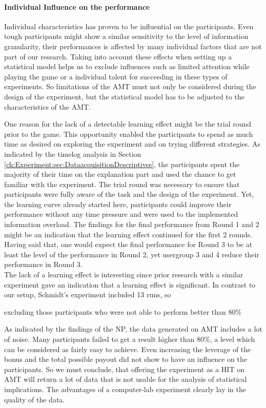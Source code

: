 \paragraph{Individual Influence on the performance}
Individual characteristics has proven to be influential on the participants. Even tough participants might show a similar sensitivity to the level of information granularity, their performances is affected by many individual factors that are not part of our research. Taking into account these effects when setting up a statistical model helps us to exclude influences such as limited attention while playing the game or a individual talent for succeeding in these types of experiments. So limitations of the \acl{AMT} must not only be considered during the design of the experiment, but the statistical model has to be adjusted to the characteristics of the \ac{AMT}.



One reason for the lack of a detectable learning effect might be the trial round prior to the game. This opportunity enabled the participants to spend as much time as desired on exploring the experiment and on trying different strategies. As indicated by the timelog analysis in Section \ref{ch:Experiment:sec:DataacquisitionDescriptives}, the participants spent the majority of their time on the explanation part and used the chance to get familiar with the experiment. The trial round was necessary to ensure that participants were fully aware of the task and the design of the experiment. Yet, the learning curve already started here, participants could improve their performance without any time pressure and were used to the implemented information overload. The findings for the final performance from Round 1 and 2 might be an indication that the learning effect continued for the first 2 rounds. Having said that, one would expect the final performance for Round 3 to be at least the level of the performance in Round 2, yet usergroup 3 and 4 reduce their performance in Round 3.\\
The lack of a learning effect is interesting since prior research with a similar experiment \citep{Schmidt2012} gave an indication that a learning effect is significant. In contrast to our setup, Schmidt's experiment included 13 runs, so 

excluding those participants who were not able to perform better than 80\%


As indicated by the findings of the \acl{NP}, the data generated on \ac{AMT} includes a lot of noise. Many participants failed to get a result higher than 80\%, a level which can be considered as fairly easy to achieve. Even increasing the leverage of the bonus and the total possible payout did not show to have an influence on the participants. So we must conclude, that offering the experiment as a \ac{HIT} on \ac{AMT} will return a lot of data that is not usable for the analysis of statistical implications. The advantages of a computer-lab experiment clearly lay in the quality of the data.




